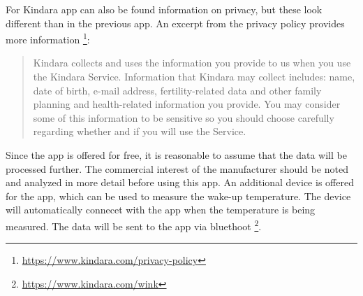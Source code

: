 For Kindara app can also be found information on privacy, but these look different than in the previous app. An excerpt from the privacy policy provides more information \footnote{\url{https://www.kindara.com/privacy-policy}}:
\begin{quote}
	Kindara collects and uses the information you provide to us when you use the Kindara Service. Information that Kindara may collect includes: name, date of birth, e-mail address, fertility-related data and other family planning and health-related information you provide. You may consider some of this information to be sensitive so you should choose carefully regarding whether and if you will use the Service.
\end{quote}
Since the app is offered for free, it is reasonable to assume that the data will be processed further. The commercial interest of the manufacturer should be noted and analyzed in more detail before using this app.
An additional device is offered for the app, which can be used to measure the wake-up temperature. The device will automatically connecet with the app when the temperature is being measured. The data will be sent to the app via bluethoot \footnote{\url{https://www.kindara.com/wink}}.

